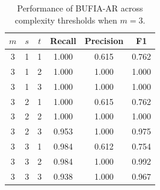 \begin{table}
\centering
\setlength{\tabcolsep}{6pt}
\begin{tabular}{cccccc}
\toprule
 $m$ & $s$ & $t$ & Recall & Precision & F1    \\
 \midrule
 3   & 1   & 1   & 1.000  & 0.615     & 0.762 \\
 3   & 1   & 2   & 1.000  & 1.000     & 1.000 \\
 3   & 1   & 3   & 1.000  & 1.000     & 1.000 \\
 3   & 2   & 1   & 1.000  & 0.615     & 0.762 \\
 3   & 2   & 2   & 1.000  & 1.000     & 1.000 \\
 3   & 2   & 3   & 0.953  & 1.000     & 0.975 \\
 3   & 3   & 1   & 0.984  & 0.612     & 0.754 \\
 3   & 3   & 2   & 0.984  & 1.000     & 0.992 \\
 3   & 3   & 3   & 0.938  & 1.000     & 0.967 \\
\bottomrule
\end{tabular}
\caption{Performance of BUFIA-AR across complexity thresholds when $m =3$.}
\label{tab:ar_grid}
\end{table}

